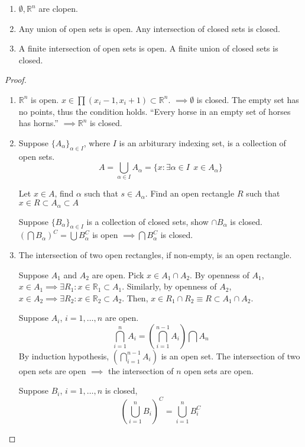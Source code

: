 \documentclass[a4paper]{article}
\numberwithin{equation}{section}
\newcommand{\R}{\mathbb{R}}
\begin{document}
\begin{theorem}
    \begin{enumerate}
        \item $\emptyset,\R^n$ are clopen.
        \item Any union of open sets is open. Any intersection of closed sets is closed.
        \item A finite intersection of open sets is open. A finite union of closed sets is closed.
    \end{enumerate}
    \begin{proof}
        \begin{enumerate}
            \item $\R^n$ is open. $x\in\prod(x_i-1,x_i+1)\subset\R^n$. $\implies\emptyset$ is closed. The empty set has no points, thus the condition holds. ``Every horse in an empty set of horses has horns.'' $\implies\R^n$ is closed.
            \item Suppose $\{A_\alpha\}_{\alpha\in I}$, where $I$ is an arbiturary indexing set, is a collection of open sets.
            \begin{equation}
                A=\bigcup_{\alpha\in I}A_{\alpha}=\{x:\exists\alpha\in I\:\:x\in A_\alpha\}
            \end{equation}

            Let $x\in A$, find $\alpha$ such that $s\in A_\alpha$. Find an open rectangle $R$ such that $x\in R\subset A_\alpha\subset A$

            Suppose $\{B_\alpha\}_{\alpha\in I}$ is a collection of closed sets, show $\cap B_\alpha$ is closed.
            $\left(\bigcap B_\alpha\right)^C=\bigcup B_\alpha^C$ is open $\implies\bigcap B_\alpha^C$ is closed.
            \item \begin{lemma}
                The intersection of two open rectangles, if non-empty, is an open rectangle.
            \end{lemma}
            Suppose $A_1$ and $A_2$ are open. Pick $x\in A_1\cap A_2$. By openness of $A_1$, $x\in A_1\implies\exists R_1: x\in\R_1\subset A_1$. Similarly, by openness of $A_2$, $x\in A_2\implies\exists R_2: x\in\R_2\subset A_2$. Then, $x\in R_1\cap R_2\equiv R\subset A_1\cap A_2$.

            Suppose $A_i$, $i=1,\dots,n$ are open.
            \begin{equation}
                \bigcap_{i=1}^n A_i=\left(\bigcap_{i=1}^{n-1}A_i\right)\bigcap A_n
            \end{equation}
            By induction hypothesis, $\left(\bigcap_{i=1}^{n-1}A_i\right)$ is an open set. The intersection of two open sets are open $\implies$ the intersection of $n$ open sets are open.

            Suppose $B_i$, $i=1,\dots,n$ is closed,
            \begin{equation}
                \left(\bigcup_{i=1}^nB_i\right)^C=\bigcup_{i=1}^nB_i^C
            \end{equation}        
        \end{enumerate}
    \end{proof}
\end{theorem}
\end{document}
